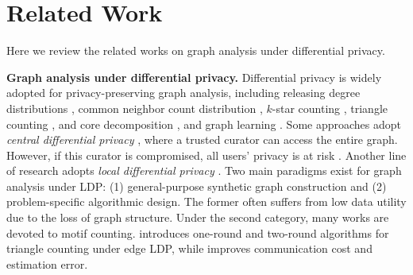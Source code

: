 \section{Related Work}
\label{sec:related}
Here we review the related works on graph analysis under differential privacy. 

\noindent
{\bf Graph analysis under differential privacy.}
Differential privacy is widely adopted for privacy-preserving graph analysis, including releasing degree distributions {\cite{hay2009boosting, hay2009accurate, day2016publishing, macwan2018node}}, 
{common neighbor count distribution \cite{lv2024publishing}}, 
$k$-star counting \cite{nissim2007smooth, karwa2011private}, {triangle counting \cite{ ding2018privacy, imola2021locally,lv2021publishing, imola2022communication, imola2022differentially}}, and core decomposition \cite{dhulipala2022differential}, and {graph learning \cite{sajadmanesh2021locally, lin2022towards, wu2022linkteller, zhu2023blink, wei2024poincare}}. 
Some approaches adopt {\em central differential privacy} \cite{nissim2007smooth, hay2009boosting, karwa2011private, zhang2015private, lv2024publishing}, where a trusted curator can access the entire graph. However, if this curator is compromised, all users' privacy is at risk \cite{imola2021locally, jiang2021applications}. 
{Another line of research adopts {\em local differential privacy} \cite{qin_generating_2017, wei2020asgldp, imola2021locally, imola2022communication, eden2023triangle,liu2022collecting,  sun2019analyzing, imola2022differentially}. }
Two main paradigms exist for graph analysis under LDP: 
(1) {general-purpose synthetic graph construction \cite{qin2017generating, zhang2018two, gao2018local, ju2019generating, liu2020privag, ye2020lf,hou2023ppdu}} and 
(2) problem-specific algorithmic design. 
The former often suffers from low data utility due to the loss of graph structure. 
Under the second category, many works are devoted to motif counting. 
\cite{imola2021locally} introduces one-round and two-round algorithms for triangle counting under edge LDP, while \cite{imola2022communication} improves communication cost and estimation error. 
